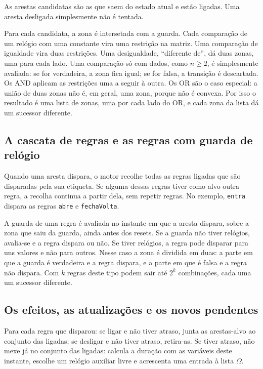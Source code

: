 \documentclass[11pt,a4paper]{article}
\newcommand{\code}[1]{\texttt{#1}}
\newcommand{\Om}{$\Omega$}
\begin{document}
As arestas candidatas são as que saem do estado atual e estão ligadas. Uma aresta desligada simplesmente não é tentada.

Para cada candidata, a zona é intersetada com a guarda. Cada comparação de um relógio com uma constante vira uma restrição na matriz. Uma comparação de igualdade vira duas restrições. Uma desigualdade, ``diferente de'', dá duas zonas, uma para cada lado. Uma comparação só com dados, como \(n \geq 2\), é simplesmente avaliada: se for verdadeira, a zona fica igual; se for falsa, a transição é descartada. Os AND aplicam as restrições uma a seguir à outra. Os OR são o caso especial: a união de duas zonas não é, em geral, uma zona, porque não é convexa. Por isso o resultado é uma lista de zonas, uma por cada lado do OR, e cada zona da lista dá um sucessor diferente.

\subsection{A cascata de regras e as regras com guarda de relógio}

Quando uma aresta dispara, o motor recolhe todas as regras ligadas que são disparadas pela sua etiqueta. Se alguma dessas regras tiver como alvo outra regra, a recolha continua a partir dela, sem repetir regras. No exemplo, \code{entra} dispara as regras \code{abre} e \code{fechaVolta}.

A guarda de uma regra é avaliada no instante em que a aresta dispara, sobre a zona que saiu da guarda, ainda antes dos resets. Se a guarda não tiver relógios, avalia-se e a regra dispara ou não. Se tiver relógios, a regra pode disparar para uns valores e não para outros. Nesse caso a zona é dividida em duas: a parte em que a guarda é verdadeira e a regra dispara, e a parte em que é falsa e a regra não dispara. Com \(k\) regras deste tipo podem sair até \(2^k\) combinações, cada uma um sucessor diferente.

\subsection{Os efeitos, as atualizações e os novos pendentes}

Para cada regra que disparou: se ligar e não tiver atraso, junta as arestas-alvo ao conjunto das ligadas; se desligar e não tiver atraso, retira-as. Se tiver atraso, não mexe já no conjunto das ligadas: calcula a duração com as variáveis deste instante, escolhe um relógio auxiliar livre e acrescenta uma entrada à lista \Om.
\end{document}
